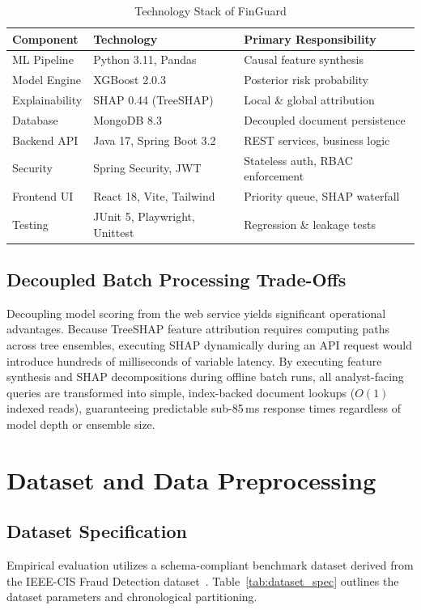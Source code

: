 \documentclass[conference]{IEEEtran}
\begin{document}
\begin{table}[t]
\centering
\caption{Technology Stack of FinGuard}
\label{tab:tech_stack}
\small
\begin{tabular}{lll}
\toprule
\textbf{Component} & \textbf{Technology} & \textbf{Primary Responsibility} \\
\midrule
ML Pipeline & Python 3.11, Pandas & Causal feature synthesis \\
Model Engine & XGBoost 2.0.3 & Posterior risk probability \\
Explainability & SHAP 0.44 (TreeSHAP) & Local \& global attribution \\
Database & MongoDB 8.3 & Decoupled document persistence \\
Backend API & Java 17, Spring Boot 3.2 & REST services, business logic \\
Security & Spring Security, JWT & Stateless auth, RBAC enforcement \\
Frontend UI & React 18, Vite, Tailwind & Priority queue, SHAP waterfall \\
Testing & JUnit 5, Playwright, Unittest & Regression \& leakage tests \\
\bottomrule
\end{tabular}
\end{table}

\subsection{Decoupled Batch Processing Trade-Offs}
Decoupling model scoring from the web service yields significant operational advantages. Because TreeSHAP feature attribution requires computing paths across tree ensembles, executing SHAP dynamically during an API request would introduce hundreds of milliseconds of variable latency. By executing feature synthesis and SHAP decompositions during offline batch runs, all analyst-facing queries are transformed into simple, index-backed document lookups ($O(1)$ indexed reads), guaranteeing predictable sub-85\,ms response times regardless of model depth or ensemble size.

\section{Dataset and Data Preprocessing}

\subsection{Dataset Specification}
Empirical evaluation utilizes a schema-compliant benchmark dataset derived from the IEEE-CIS Fraud Detection dataset~\cite{ieee2019fraud}. Table~\ref{tab:dataset_spec} outlines the dataset parameters and chronological partitioning.
\end{document}

